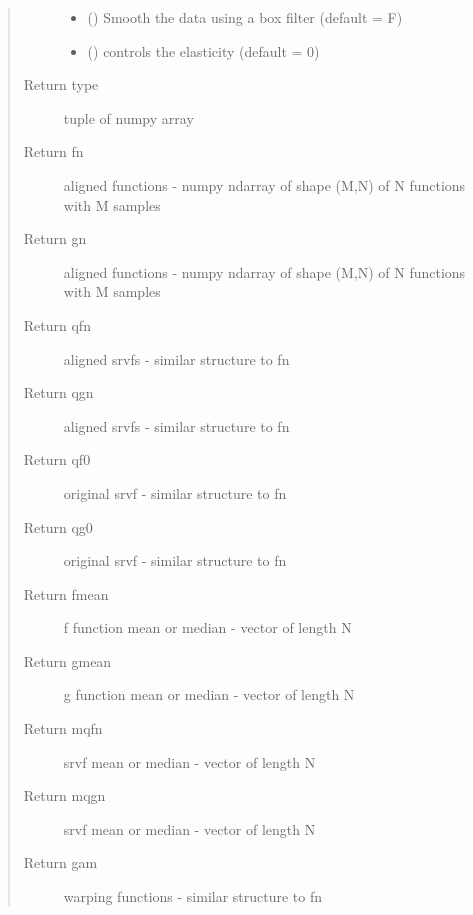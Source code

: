 \documentclass[letterpaper,10pt,english]{sphinxmanual}
\begin{document}
\begin{fulllineitems}
\begin{quote}
\begin{description}
\begin{itemize}
\item {} 
 () \textendash{} Smooth the data using a box filter (default = F)

\item {} 
 () \textendash{} controls the elasticity (default = 0)

\end{itemize}

\item[{Return type}] \leavevmode
tuple of numpy array

\item[{Return fn}] \leavevmode
aligned functions - numpy ndarray of shape (M,N) of N
functions with M samples

\item[{Return gn}] \leavevmode
aligned functions - numpy ndarray of shape (M,N) of N
functions with M samples

\item[{Return qfn}] \leavevmode
aligned srvfs - similar structure to fn

\item[{Return qgn}] \leavevmode
aligned srvfs - similar structure to fn

\item[{Return qf0}] \leavevmode
original srvf - similar structure to fn

\item[{Return qg0}] \leavevmode
original srvf - similar structure to fn

\item[{Return fmean}] \leavevmode
f function mean or median - vector of length N

\item[{Return gmean}] \leavevmode
g function mean or median - vector of length N

\item[{Return mqfn}] \leavevmode
srvf mean or median - vector of length N

\item[{Return mqgn}] \leavevmode
srvf mean or median - vector of length N

\item[{Return gam}] \leavevmode
warping functions - similar structure to fn

\end{description}\end{quote}

\end{fulllineitems}
\end{document}
